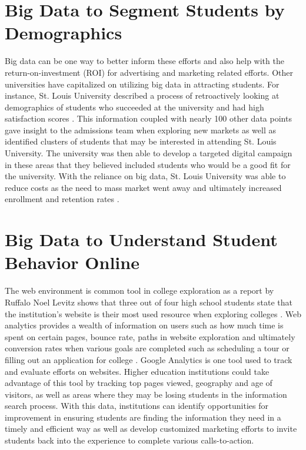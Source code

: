 \documentclass[sigconf]{acmart}
\begin{document}
\section{Big Data to Segment Students by Demographics}
Big data can be one way to better inform these efforts and also help with the return-on-investment (ROI) for advertising and marketing related efforts. Other universities have capitalized on utilizing big data in attracting students. For instance, St. Louis University described a process of retroactively looking at demographics of students who succeeded at the university and had high satisfaction scores \cite{Selingo2017}. This information coupled with nearly 100 other data points gave insight to the admissions team when exploring new markets as well as identified clusters of students that may be interested in attending St. Louis University. The university was then able to develop a targeted digital campaign in these areas that they believed included students who would be a good fit for the university. With the reliance on big data, St. Louis University was able to reduce costs as the need to mass market went away and ultimately increased enrollment and retention rates \cite{Selingo2017}.  

\section{Big Data to Understand Student Behavior Online}
The web environment is common tool in college exploration as a report by Ruffalo Noel Levitz shows that three out of four high school students state that the institution's website is their most used resource when exploring colleges \cite{Geyer2016}. Web analytics provides a wealth of information on users such as how much time is spent on certain pages, bounce rate, paths in website exploration and ultimately conversion rates when various goals are completed such as scheduling a tour or filling out an application for college \cite{Omidvar2011}. Google Analytics is one tool used to track and evaluate efforts on websites. Higher education institutions could take advantage of this tool by tracking top pages viewed, geography and age of visitors, as well as areas where they may be losing students in the information search process. With this data, institutions can identify opportunities for improvement in ensuring students are finding the information they need in a timely and efficient way as well as develop customized marketing efforts to invite students back into the experience to complete various calls-to-action. 
\end{document}
